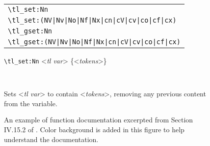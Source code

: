 \documentclass{ltugboat}
\begin{document}
\begin{figure*}[htpb]
\centering
{}
\begin{minipage}[t]{0.52\linewidth}
\begin{mdframed}[backgroundcolor=yellow!50, style=plainmdbox]
\begin{tabular}{l}
\toprule
\verb|\tl_set:Nn|\\
{\color{gray}\verb|\tl_set|}\verb!:(NV|Nv|No|Nf|Nx|cn|cV|cv|co|cf|cx)! \\
\verb|\tl_gset:Nn| \\
{\color{gray}\verb|\tl_gset|}\verb!:(NV|Nv|No|Nf|Nx|cn|cV|cv|co|cf|cx)! \\ \bottomrule
\end{tabular}
\end{mdframed}
\end{minipage}
\begin{minipage}{0.4\linewidth}
\vspace*{3em}
\begin{mdframed}[backgroundcolor=cyan!50, style=plainmdbox]
\verb|\tl_set:Nn| {\ttfamily<\textsl{tl var}> \{<\textsl{tokens}>\}}
\end{mdframed}
\end{minipage}\\
\begin{minipage}[t]{0.15\linewidth}
\phantom{}
\end{minipage}
\begin{minipage}{0.82\linewidth}
\begin{mdframed}[backgroundcolor=magenta!50, style=plainmdbox]
Sets <\textit{tl var}> to contain <\textit{tokens}>, removing any previous content from the variable.
\end{mdframed}
\end{minipage}
\caption{An example of function documentation excerpted from Section IV.15.2 of \protect\cite{l3interface}. 
Color background is added in this figure to help understand the documentation.}
\label{fig:l3-doc-func-example}
\end{figure*}
\end{document}
